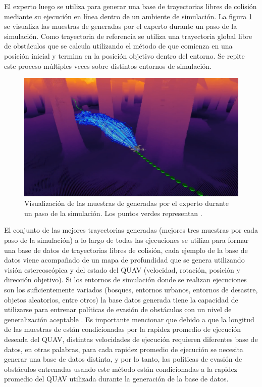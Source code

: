 El experto luego se utiliza para generar una base de trayectorias libres de colisión mediante su ejecución en línea dentro de un ambiente de simulación. La figura \ref{fig:prev-aoa-expert-sample} se visualiza las muestras de  generadas por el experto durante un paso de la simulación. Como trayectoria de referencia se utiliza una trayectoria global libre de obstáculos que se calcula utilizando el método de \cite{liu2018search} que comienza en una posición inicial y termina en la posición objetivo dentro del entorno. Se repite este proceso múltiples veces sobre distintos entornos de simulación. 

\begin{figure}[H]
    \centering
    \includegraphics[scale=0.2]{partes/img/aoa-expert-sample.png}
    \caption[Visualización de las muestras de  generadas por el experto durante un paso de la simulación.]{Visualización de las muestras de  generadas por el experto durante un paso de la simulación. Los puntos verdes representan .}
    \label{fig:prev-aoa-expert-sample}
\end{figure}


El conjunto de las mejores trayectorias generadas (mejores tres muestras por cada paso de la simulación) a lo largo de todas las ejecuciones se utiliza para formar una base de datos de trayectorias libres de colisión, cada ejemplo de la base de datos viene acompañado de un mapa de profundidad que se genera utilizando visión estereoscópica y del estado del QUAV (velocidad, rotación, posición y dirección objetivo). Si los entornos de simulación donde se realizan ejecuciones son los suficientemente variados (bosques, entornos urbanos, entornos de desastre, objetos aleatorios, entre otros) la base datos generada tiene la capacidad de utilizarse para entrenar políticas de evasión de obstáculos con un nivel de generalización aceptable \cite{Loquercio2021}. Es importante mencionar que debido a que la longitud de las muestras de  están condicionadas por la rapidez promedio de ejecución deseada del QUAV, distintas velocidades de ejecución requieren diferentes base de datos, en otras palabras, para cada rapidez promedio de ejecución se necesita generar una base de datos distinta, y por lo tanto, las políticas de evasión de obstáculos entrenadas usando este método están condicionadas a la rapidez promedio del QUAV utilizada durante la generación de la base de datos.

